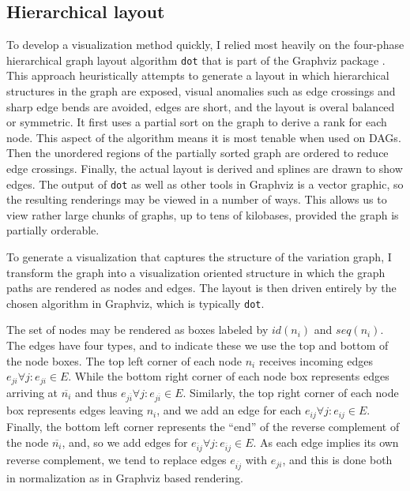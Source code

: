 \subsection{Hierarchical layout}

To develop a visualization method quickly, I relied most heavily on the four-phase hierarchical graph layout algorithm {\tt dot} \cite{gansner1993technique} that is part of the Graphviz package \cite{gansner2000open,ellson2001graphviz}.
This approach heuristically attempts to generate a layout in which hierarchical structures in the graph are exposed, visual anomalies such as edge crossings and sharp edge bends are avoided, edges are short, and the layout is overal balanced or symmetric.
It first uses a partial sort on the graph to derive a rank for each node.
This aspect of the algorithm means it is most tenable when used on DAGs.
Then the unordered regions of the partially sorted graph are ordered to reduce edge crossings.
Finally, the actual layout is derived and splines are drawn to show edges.
The output of {\tt dot} as well as other tools in Graphviz is a vector graphic, so the resulting renderings may be viewed in a number of ways.
This allows us to view rather large chunks of graphs, up to tens of kilobases, provided the graph is partially orderable.

To generate a visualization that captures the structure of the variation graph, I transform the graph into a visualization oriented structure in which the graph paths are rendered as nodes and edges.
The layout is then driven entirely by the chosen algorithm in Graphviz, which is typically {\tt dot}.

The set of nodes may be rendered as boxes labeled by $id(n_i)$ and $seq(n_i)$.
The edges have four types, and to indicate these we use the top and bottom of the node boxes.
The top left corner of each node $n_i$ receives incoming edges $e_{ji} \forall j : e_{ji} \in E$.
While the bottom right corner of each node box represents edges arriving at $\overline{n_i}$ and thus $e_{j\overline{i}} \forall j : e_{j\overline{i}} \in E$.
Similarly, the top right corner of each node box represents edges leaving $n_i$, and we add an edge for each $e_{ij} \forall j : e_{ij} \in E$.
Finally, the bottom left corner represents the ``end'' of the reverse complement of the node $\overline{n_i}$, and, so we add edges for $e_{\overline{i}j} \forall j : e_{\overline{i}j} \in E$.
As each edge implies its own reverse complement, we tend to replace edges $e_{\overline{ij}}$ with $e_{ji}$, and this is done both in normalization as in Graphviz based rendering.

